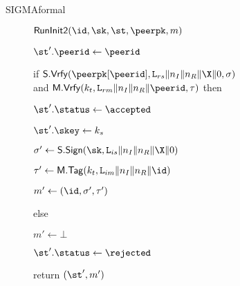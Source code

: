 \begin{collect*}{SIGMAformal}{}{}{}{}
\begin{figure}[tp]
\begin{minipage}[t]{0.49\textwidth}
\begin{algorithm}{$\RunInit(\id,\sk,\st,\peerpk,m)$}
			\item \frame{$(\peerid,\sigma,\tau) \gets \ENCDec(\ke,\ciph)$}
			\item $\st'.\peerid \gets \peerid$
			
			\item if $\SIGScheme.\SIGVerify(\peerpk[\peerid], \labelrs\|\nonce_I\|\nonce_R\|\X\|\Y, \sigma)$\\
				and $\MACScheme.\MACVerify(\kt, \labelrm\|\nonce_I\|\nonce_R\|\peerid, \tau)$ then
			\item \hindent $\st'.\status \gets \accepted$
			\item \hindent $\st'.\skey \gets \ks$
			\item \hindent $\sigma' \gets \SIGScheme.\SIGSign(\sk, \labelis\|\nonce_I\|\nonce_R\|\X\|\Y)$
			\item \hindent $\tau' \gets \MACScheme.\MACTag(\kt, \labelim\|\nonce_I\|\nonce_R\|\id)$
			\item \hindent $m' \gets (\id, \sigma', \tau')$ \newline
				\null\hindent {}
			\item else
			\item \hindent $m' \gets \bot$
			\item \hindent $\st'.\status \gets \rejected$
			\item return $(\st', m')$
		\end{algorithm}

		\ExptSepSpace


\end{minipage}
\end{figure}
\end{collect*}
